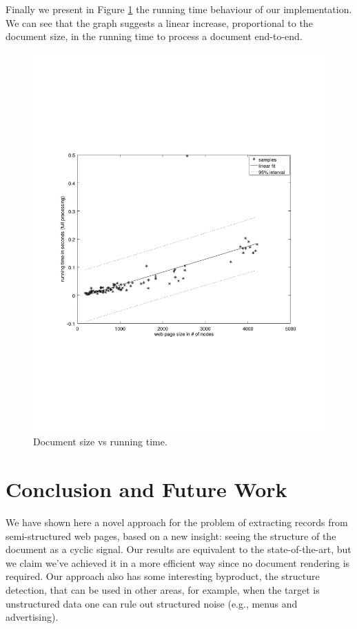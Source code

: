 \documentclass{vldb}
\begin{document}
Finally we present in Figure \ref{fig:runtime} the running time behaviour of our
implementation. We can see that the graph suggests a linear increase,
proportional to the document size, in the running time to process a document
end-to-end.

\begin{figure}[h]
  \centering
     \includegraphics[trim={2.5cm 7.5cm 1cm 6.5cm}, width=\linewidth
     ]{img/runtime.pdf}
  \caption{Document size vs running time.}
  \label{fig:runtime}
\end{figure}


\section{Conclusion and Future Work}\label{sec:con}

We have shown here a novel approach for the problem of extracting records from
semi-structured web pages, based on a new insight: seeing the structure of the
document as a cyclic signal. Our results are equivalent to the state-of-the-art,
but we claim we've achieved it in a more efficient way since no document
rendering is required. Our approach also has some interesting byproduct, the structure
detection, that can be used in other areas, for example, when the target is
unstructured data one can rule out structured noise (e.g., menus and
advertising).
\end{document}
